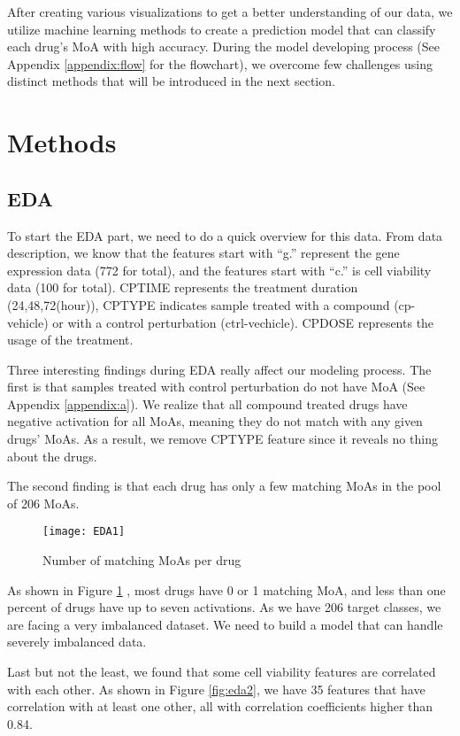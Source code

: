 \documentclass[11.5pt]{article}
\begin{document}
After creating various visualizations to get a better understanding of our data, we utilize machine learning methods to create a prediction model that can classify each drug’s MoA with high accuracy. During the model developing process (See Appendix \ref{appendix:flow} for the flowchart), we overcome few challenges using distinct methods that will be introduced in the next section. 



\section{Methods}

\subsection{EDA}

To start the EDA part, we need to do a quick overview for this data. From data description, we know that the features start with “g.” represent the gene expression data (772 for total), and the features start with “c.” is cell viability data (100 for total). CPTIME represents the treatment duration (24,48,72(hour)), CPTYPE indicates sample treated with a compound (cp-vehicle) or with a control perturbation (ctrl-vechicle). CPDOSE represents the usage of the treatment.

Three interesting findings during EDA really affect our modeling process. The first is that samples treated with control perturbation do not have MoA (See Appendix \ref{appendix:a}). We realize that all compound treated drugs have negative activation for all MoAs, meaning they do not match with any given drugs' MoAs. As a result, we remove CPTYPE feature since it reveals no thing about the drugs.

The second finding is that each drug has only a few matching MoAs in the pool of 206 MoAs. 

\begin{figure}[htb]
  \centering
    \texttt{[image: EDA1]}
  \caption{Number of matching MoAs per drug}
  \label{fig:eda1}
\end{figure}

As shown in Figure \ref{fig:eda1} , most drugs have 0 or 1 matching MoA, and less than one percent of drugs have up to seven activations. As we have 206 target classes, we are facing a very imbalanced dataset. We need to build a model that can handle severely imbalanced data.

Last but not the least, we found that some cell viability features are correlated with each other. As shown in Figure \ref{fig:eda2}, we have 35 features that have correlation with at least one other, all with correlation coefficients higher than 0.84. 
\end{document}
